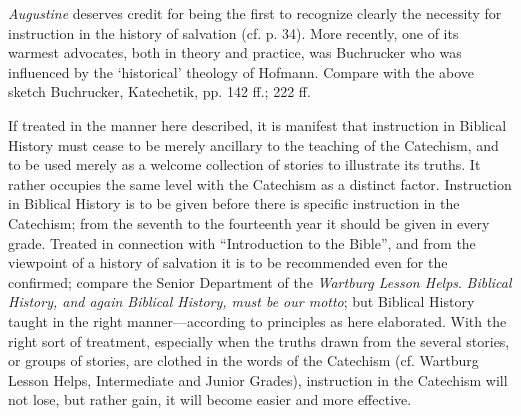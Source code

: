 \emph{Augustine} deserves credit for being the first to recognize clearly the necessity for instruction in the history of salvation (cf. p. 34). More recently, one of its warmest advocates, both in theory and practice, was Buchrucker who was influenced by the ‘historical’ theology of Hofmann. Compare with the above sketch Buchrucker, Katechetik, pp. 142 ff.; 222 ff.

If treated in the manner here described, it is manifest that instruction in Biblical History must cease to be merely
ancillary to the teaching of the Catechism, and to be used merely as a welcome collection of stories to illustrate its truths. It rather occupies the same level with the Catechism as a distinct factor. Instruction in Biblical History is to be given before there is specific instruction in the Catechism; from the seventh to the fourteenth year it should be given in every grade. Treated in connection with “Introduction to the Bible”, and from the viewpoint of a history of salvation it is to be recommended even for the confirmed; compare the Senior Department of the \emph{Wartburg Lesson Helps}. \emph{Biblical History, and again Biblical History, must be our motto}; but Biblical History taught in the right manner—according to principles as here elaborated. With the right sort of treatment, especially when the truths drawn from the several stories, or groups of stories, are clothed in the words of the Catechism (cf. Wartburg Lesson Helps, Intermediate and Junior Grades), instruction in the Catechism will not lose, but rather gain, it will become easier and more effective.






